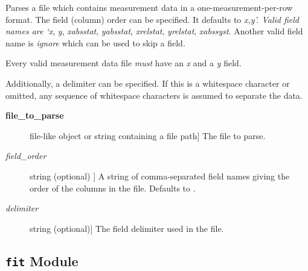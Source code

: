 \documentclass[letterpaper,10pt,english]{sphinxmanual}
\begin{document}
\begin{fulllineitems}
\label{api/kafe:kafe.file_tools.parse_column_data}
Parses a file which contains measurement data in a one-measurement-per-row format.
The field (column) order can be specified. It defaults to \emph{x,y'. Valid field names are
{}`x}, \emph{y}, \emph{xabsstat}, \emph{yabsstat}, \emph{xrelstat}, \emph{yrelstat}, \emph{xabssyst}. Another
valid field name is \emph{ignore} which can be used to skip a field.

Every valid measurement data file \emph{must} have an \emph{x} and a \emph{y} field.

Additionally, a delimiter can be specified. If this is a whitespace character or omitted, any
sequence of whitespace characters is assumed to separate the data.
\begin{description}
\item[{\textbf{file\_to\_parse}}] \leavevmode{[}file-like object or string containing a file path{]}
The file to parse.

\item[{\emph{field\_order}}] \leavevmode{[}string (optional) {]}
A string of comma-separated field names giving the order of the columns in the file. Defaults to .

\item[{\emph{delimiter}}] \leavevmode{[}string (optional){]}
The field delimiter used in the file.

\end{description}

\end{fulllineitems}



\subsection{\texttt{fit} Module}
\label{api/kafe:fit-module}\label{api/kafe:module-kafe.fit}\label{api/kafe:module-fit}
\end{document}
